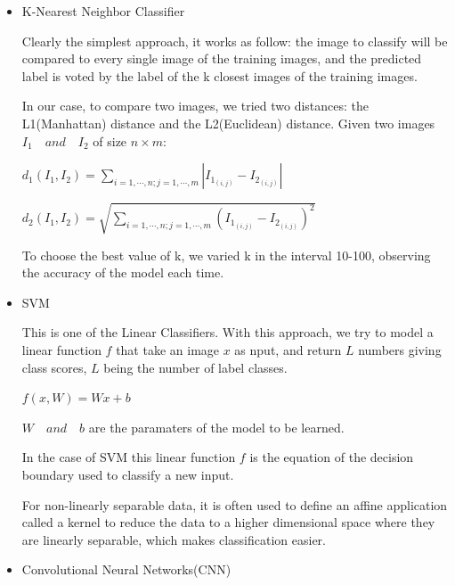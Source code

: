 \documentclass[a4paper, 12pt]{report}
\begin{document}
\begin{itemize}

    \item{K-Nearest Neighbor Classifier}

    Clearly the simplest approach, it works as follow: the image to classify will be compared to every single image of the training images, and the predicted label is voted by the label of the k closest images of the training images.

    In our case, to compare two images, we tried two distances: the L1(Manhattan) distance and the L2(Euclidean) distance. Given two images $ I_1 \quad and \quad I_2 $ of size $ n \times m :$

    \begin{center}

        $ d_1 (I_1, I_2) = \sum_{i=1, \cdots, n; j = 1, \cdots, m} | I_{1_{(i, j)}} - I_{2_{(i, j)}}| $

        $ d_2 (I_1, I_2) = \sqrt{\sum_{i=1, \cdots, n; j = 1, \cdots, m} (I_{1_{(i, j)}} - I_{2_{(i, j)}})^2} $

    \end{center}

    To choose the best value of k, we varied k in the interval 10-100, observing the accuracy of the model each time.


    \item{SVM}

    This is one of the Linear Classifiers. With this approach, we try to model a linear function $ f $ that take an image $ x $  as nput, and return $ L $ numbers giving class scores, $ L $ being the number of label classes.

    \begin{center}

        $ f(x, W) = W x + b $

    \end{center}

    $ W \quad and \quad b $ are the paramaters of the model to be learned.

    In the case of SVM this linear function $ f $ is the equation of the decision boundary used to classify a new input. 

    For non-linearly separable data, it is often used to define an affine application called a kernel to reduce the data to a higher dimensional space where they are linearly separable, which makes classification easier.

    \item{Convolutional Neural Networks(CNN)}


\end{itemize}
\end{document}
